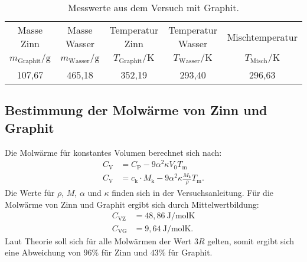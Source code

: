 \begin{table}
  \centering
  \caption{Messwerte aus dem Versuch mit Graphit.}
  \label{tab:graphit}
   \begin{tabular}{c c c c c}
\toprule
Masse Zinn & Masse Wasser & Temperatur Zinn & Temperatur Wasser  & Mischtemperatur \\
$m_\mathrm{Graphit}/\si{\gram}$ & $m_\mathrm{Wasser}/\si{\gram}$ & $T_\mathrm{Graphit}/\si{\kelvin}$ & $T_\mathrm{Wasser}/\si{\kelvin}$ & $T_\mathrm{Misch}/\si{\kelvin}$ \\
\midrule
107,67 & 465,18 & 352,19 & 293,40 & 296,63 \\
\bottomrule
\end{tabular}
\end{table}




\subsection{Bestimmung der Molwärme von Zinn und Graphit}
Die Molwärme für konstantes Volumen berechnet sich nach:
\begin{align}
  C_\mathrm{V} & =C_\mathrm{P}-9\alpha^2\kappa V_\mathrm{0}T_\mathrm{m}\\
  C_\mathrm{V} & =c_\mathrm{k}\cdot M_\mathrm{k}-9\alpha^2\kappa \frac{M_\mathrm{k}}{\rho}T_\mathrm{m}.
\end{align}
Die Werte für $\rho$, $M$, $\alpha$ und $\kappa$ finden sich in der Versuchsanleitung.
Für die Molwärme von Zinn und Graphit ergibt sich durch Mittelwertbildung:
\begin{align*}
  C_\mathrm{VZ}&=48,86 \ \si{\joule\per\mol\kelvin}\\
  C_\mathrm{VG}&=9,64  \ \si{\joule\per\mol\kelvin}.
\end{align*}
Laut Theorie soll sich für alle Molwärmen der Wert $3R$ gelten, somit ergibt sich
eine Abweichung von
$96\si{\percent}$
für Zinn und $43\si{\percent}$ für Graphit.
